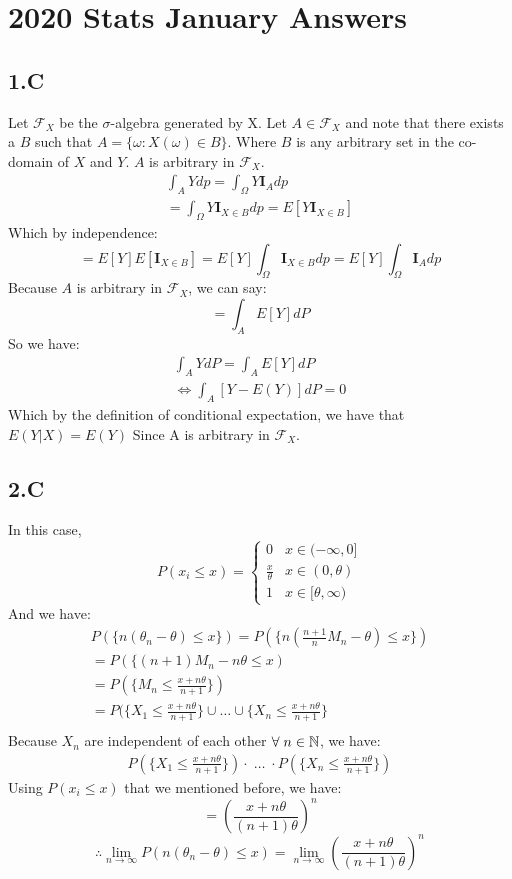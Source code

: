 \section{2020 Stats January Answers}
\subsection{1.C}
Let \(\mathcal{F}_X\) be the \(\sigma\)-algebra generated by X.  Let \(A \in \mathcal{F}_X\) and note that there exists a $B$ such that \(A=\{\omega:X(\omega) \in B\}\).  Where $B$ is any arbitrary set in the co-domain of $X$ and $Y$.  $A$ is arbitrary in \(\mathcal{F}_X\).
\begin{align*}
    \int_A Y dp = \int_\Omega Y \mathbf{I}_A dp \\
    =\int_\Omega Y \mathbf{I}_{X\in B} dp = E[Y \mathbf{I}_{X\in B}]
\end{align*}
Which by independence:
\[
= E[Y]E[\mathbf{I}_{X\in B}] = E[Y]\int_\Omega \mathbf{I}_{X\in B} dp= E[Y]\int_\Omega \mathbf{I}_{A} dp
\]
Because $A$ is arbitrary in \(\mathcal{F}_X\), we can say:
\[
= \int_A E[Y] dP
\]
So we have:
\begin{align*}
    \int_A YdP = \int_A E[Y]dP \\
    \Leftrightarrow \int_A[Y-E(Y)]dP=0
\end{align*}
Which by the definition of conditional expectation, we have that \(E(Y|X)=E(Y)\) Since A is arbitrary in \(\mathcal{F}_X\).
\subsection{2.C}
In this case,
\[
P(x_i \leq x) =
\begin{cases}
    0 & x \in (-\infty,0] \\
    \frac{x}{\theta} & x\in (0,\theta) \\
    1 & x\in [\theta, \infty)
\end{cases}
\]
And we have:
\begin{align*}
    P(\{n(\theta_n - \theta) \leq x\})
    = P(\{n(\frac{n+1}{n}M_n -\theta)\leq x \}) \\
    = P(\{(n+1)M_n - n\theta \leq x) \\
    = P(\{M_n \leq \frac{x+n\theta}{n+1}\}) \\
    = P(\{X_1 \leq \frac{x+n\theta}{n+1}\}\cup\ldots\cup\{X_n \leq \frac{x+n\theta}{n+1}\} \\
\end{align*}
Because \(X_n\) are independent of each other \(\forall \; n\in {\Bbb N} \), we have:
\begin{align*}
    P(\{X_1 \leq \frac{x+n\theta}{n+1}\})\cdot\;\ldots\; \cdot P(\{X_n \leq \frac{x+n\theta}{n+1}\})
\end{align*}
Using \(P(x_i \leq x)\) that we mentioned before, we have:
\[
= \left ( \frac{x+n\theta}{(n+1)\theta} \right)^n
\]
\[
\therefore \lim_{n\rightarrow \infty} P(n(\theta_n-\theta) \leq x) = \lim_{n\rightarrow\infty}\left ( \frac{x+n\theta}{(n+1)\theta} \right)^n
\]